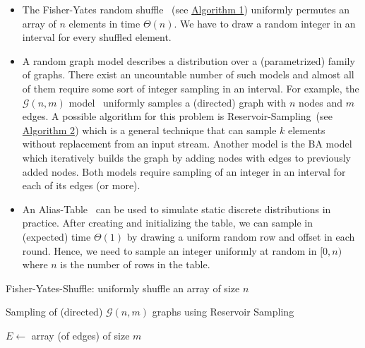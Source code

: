 \documentclass[a4paper, UKenglish, cleveref, autoref, thm-restate]{lipics-v2021}
\begin{document}
\begin{itemize}
    \item The Fisher-Yates random shuffle~\cite{FY} (see \hyperref[alg:fy]{Algorithm 1}) uniformly permutes an array of $n$ elements in time $\Theta(n)$. 
    We have to draw a random integer in an interval for every shuffled element.
    \item A random graph model describes a distribution over a (parametrized) family of graphs. 
    There exist an uncountable number of such models and almost all of them require some sort of integer sampling in an interval. 
    For example, the $\mathcal{G}(n,m)$ model~\cite{GNM} uniformly samples a (directed) graph with $n$ nodes and $m$ edges. 
    A possible algorithm for this problem is Reservoir-Sampling~\cite{Reservoir}(see \hyperref[alg:gnm]{Algorithm 2}) which is a general technique that can sample $k$ elements without replacement from an input stream. 
    Another model is the BA model~\cite{BABook,BA} which iteratively builds the graph by adding nodes with edges to previously added nodes. %
    Both models require sampling of an integer in an interval for each of its edges (or more).
    \item An Alias-Table~\cite{Alias} can be used to simulate static discrete distributions in practice. 
    After creating and initializing the table, we can sample in (expected) time $\Theta(1)$ by drawing a uniform random row and offset in each round. 
    Hence, we need to sample an integer uniformly at random in $[0,n)$ where $n$ is the number of rows in the table.
\end{itemize}


\begin{algorithm}[!htb] \label{alg:fy}
    \caption{Fisher-Yates-Shuffle: uniformly shuffle an array of size $n$}
\end{algorithm}


\begin{algorithm}[!htb] \label{alg:gnm}
    \caption{Sampling of (directed) $\mathcal{G}(n,m)$ graphs using Reservoir Sampling}
    $E \leftarrow$ array (of edges) of size $m$\;
    \;
\end{algorithm}
\end{document}
